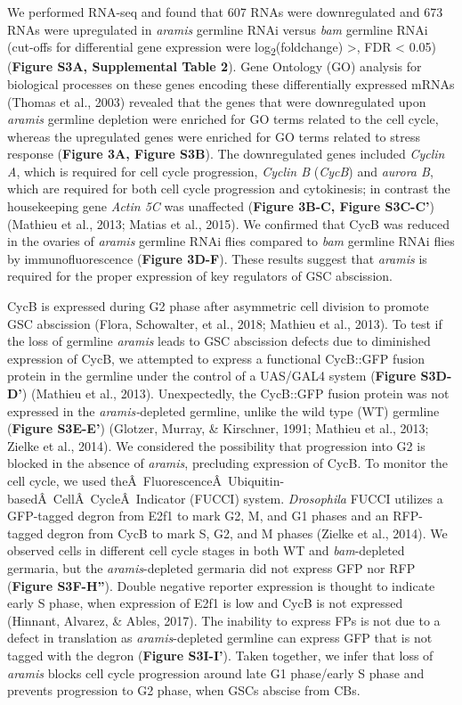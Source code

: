 \documentclass[12pt,twoside]{reedthesis}
\begin{document}
We performed RNA-seq and found that 607 RNAs were downregulated and 673
RNAs were upregulated in \emph{aramis} germline RNAi versus \emph{bam} germline
RNAi (cut-offs for differential gene expression were log\textsubscript{2}(foldchange)
\textgreater{}\textbar, FDR \textless{} 0.05) (\textbf{Figure S3A, Supplemental Table 2}). Gene
Ontology (GO) analysis for biological processes on these genes encoding
these differentially expressed mRNAs
(Thomas et al., 2003) revealed that the genes that were
downregulated upon \emph{aramis} germline depletion were enriched for GO
terms related to the cell cycle, whereas the upregulated genes were
enriched for GO terms related to stress response (\textbf{Figure 3A, Figure
S3B}). The downregulated genes included \emph{Cyclin A}, which is required
for cell cycle progression, \emph{Cyclin B} (\emph{CycB}) and \emph{aurora B}, which
are required for both cell cycle progression and cytokinesis; in
contrast the housekeeping gene \emph{Actin 5C} was unaffected (\textbf{Figure 3B-C,
Figure S3C-C'}) (Mathieu et al., 2013; Matias et al., 2015). We confirmed that
CycB was reduced in the ovaries of \emph{aramis} germline RNAi flies compared
to \emph{bam} germline RNAi flies by immunofluorescence (\textbf{Figure 3D-F}).
These results suggest that \emph{aramis} is required for the proper
expression of key regulators of GSC abscission.

CycB is expressed during G2 phase after asymmetric cell division to
promote GSC abscission (Flora, Schowalter, et al., 2018; Mathieu et al., 2013). To test if the
loss of germline \emph{aramis} leads to GSC abscission defects due to
diminished expression of CycB, we attempted to express a functional
CycB::GFP fusion protein in the germline under the control of a UAS/GAL4
system (\textbf{Figure S3D-D'}) (Mathieu et al., 2013). Unexpectedly, the
CycB::GFP fusion protein was not expressed in the \emph{aramis-}depleted
germline, unlike the wild type (WT) germline (\textbf{Figure S3E-E'})
(Glotzer, Murray, \& Kirschner, 1991; Mathieu et al., 2013; Zielke et al., 2014).
We considered the possibility that progression into G2 is blocked in the
absence of \emph{aramis}, precluding expression of CycB. To monitor the cell
cycle, we used theÂ~FluorescenceÂ~Ubiquitin-basedÂ~CellÂ~CycleÂ~Indicator
(FUCCI) system. \emph{Drosophila} FUCCI utilizes a GFP-tagged degron from
E2f1 to mark G2, M, and G1 phases and an RFP-tagged degron from CycB to
mark S, G2, and M phases (Zielke et al., 2014). We observed cells in
different cell cycle stages in both WT and \emph{bam}-depleted germaria, but
the \emph{aramis}-depleted germaria did not express GFP nor RFP (\textbf{Figure
S3F-H''}). Double negative reporter expression is thought to indicate
early S phase, when expression of E2f1 is low and CycB is not expressed
(Hinnant, Alvarez, \& Ables, 2017). The inability to express FPs is
not due to a defect in translation as \emph{aramis}-depleted germline can
express GFP that is not tagged with the degron (\textbf{Figure S3I-I'}).
Taken together, we infer that loss of \emph{aramis} blocks cell cycle
progression around late G1 phase/early S phase and prevents progression
to G2 phase, when GSCs abscise from CBs.
\end{document}
